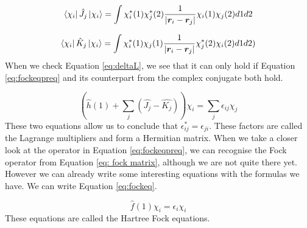  \begin{equation}\label{eq:coulomb}
    \bra{\chi_i}\hat{J}_j\ket{\chi_i} = \int\chi_i^*(1)\chi_j^*(2)\frac{1}{|\boldsymbol{r}_i- \boldsymbol{r}_j|}\chi_i(1)\chi_j(2)d1d2
 \end{equation}

 \begin{equation}\label{eq:exchange}
     \bra{\chi_i}\hat{K}_j\ket*{\chi_i} = \int\chi_i^*(1)\chi_j(1)\frac{1}{|\boldsymbol{r}_i - \boldsymbol{r}_j|}\chi_j^*(2)\chi_i(2)d1d2)
 \end{equation}
When we check Equation \ref{eq:deltaL}, we see that it can only hold if Equation \ref{eq:fockeqpreq}
and its counterpart from the complex conjugate both hold.

\begin{equation}\label{eq:fockeqpreq}
    \left(\hat{h}(1) + \sum_j(\hat{J_j} - \hat{K_j})\right)\chi_i = \sum_{j}\epsilon_{ij}\chi_j
\end{equation}
These two equations allow us to conclude that $\epsilon^*_{ij} = \epsilon_{ji}$.
These factors are called the Lagrange multipliers and form a Hermitian matrix. 
When we take a closer look at the operator in Equation \ref{eq:fockeqpreq}, we 
can recognise the Fock operator from Equation \ref{eq: fock matrix}, although
we are not quite there yet. However we can already write some interesting equations
with the formulas we have. We can write Equation \ref{eq:fockeq}.

\begin{equation}\label{eq:fockeq}
    \hat{f}(1)\chi_i = \epsilon_i\chi_i
\end{equation}
These equations are called the Hartree Fock equations.
